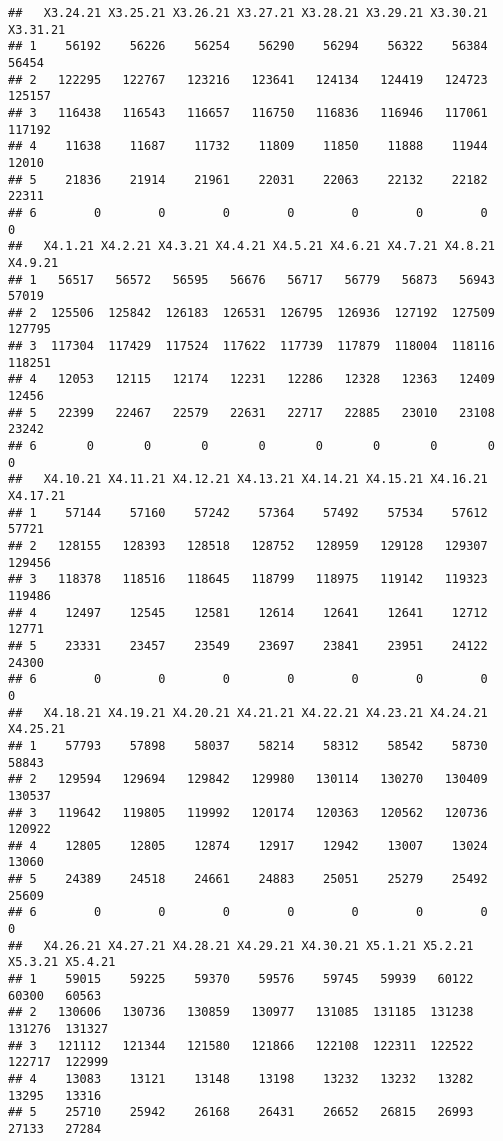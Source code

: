 \documentclass[
]{article}
\begin{document}
\begin{verbatim}
##   X3.24.21 X3.25.21 X3.26.21 X3.27.21 X3.28.21 X3.29.21 X3.30.21 X3.31.21
## 1    56192    56226    56254    56290    56294    56322    56384    56454
## 2   122295   122767   123216   123641   124134   124419   124723   125157
## 3   116438   116543   116657   116750   116836   116946   117061   117192
## 4    11638    11687    11732    11809    11850    11888    11944    12010
## 5    21836    21914    21961    22031    22063    22132    22182    22311
## 6        0        0        0        0        0        0        0        0
##   X4.1.21 X4.2.21 X4.3.21 X4.4.21 X4.5.21 X4.6.21 X4.7.21 X4.8.21 X4.9.21
## 1   56517   56572   56595   56676   56717   56779   56873   56943   57019
## 2  125506  125842  126183  126531  126795  126936  127192  127509  127795
## 3  117304  117429  117524  117622  117739  117879  118004  118116  118251
## 4   12053   12115   12174   12231   12286   12328   12363   12409   12456
## 5   22399   22467   22579   22631   22717   22885   23010   23108   23242
## 6       0       0       0       0       0       0       0       0       0
##   X4.10.21 X4.11.21 X4.12.21 X4.13.21 X4.14.21 X4.15.21 X4.16.21 X4.17.21
## 1    57144    57160    57242    57364    57492    57534    57612    57721
## 2   128155   128393   128518   128752   128959   129128   129307   129456
## 3   118378   118516   118645   118799   118975   119142   119323   119486
## 4    12497    12545    12581    12614    12641    12641    12712    12771
## 5    23331    23457    23549    23697    23841    23951    24122    24300
## 6        0        0        0        0        0        0        0        0
##   X4.18.21 X4.19.21 X4.20.21 X4.21.21 X4.22.21 X4.23.21 X4.24.21 X4.25.21
## 1    57793    57898    58037    58214    58312    58542    58730    58843
## 2   129594   129694   129842   129980   130114   130270   130409   130537
## 3   119642   119805   119992   120174   120363   120562   120736   120922
## 4    12805    12805    12874    12917    12942    13007    13024    13060
## 5    24389    24518    24661    24883    25051    25279    25492    25609
## 6        0        0        0        0        0        0        0        0
##   X4.26.21 X4.27.21 X4.28.21 X4.29.21 X4.30.21 X5.1.21 X5.2.21 X5.3.21 X5.4.21
## 1    59015    59225    59370    59576    59745   59939   60122   60300   60563
## 2   130606   130736   130859   130977   131085  131185  131238  131276  131327
## 3   121112   121344   121580   121866   122108  122311  122522  122717  122999
## 4    13083    13121    13148    13198    13232   13232   13282   13295   13316
## 5    25710    25942    26168    26431    26652   26815   26993   27133   27284

\end{verbatim}
\end{document}
